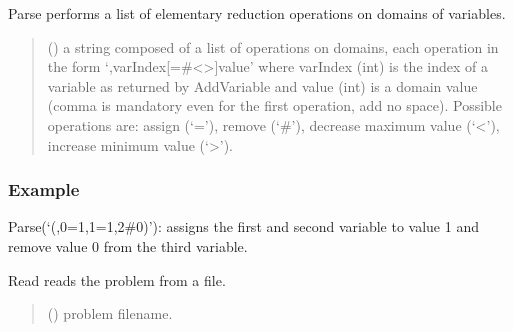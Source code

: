 \documentclass[letterpaper,10pt,openany,oneside,english]{sphinxmanual}
\begin{document}
\begin{fulllineitems}
\begin{fulllineitems}
\label{\detokenize{ref/ref_python:pytoulbar2.CFN.Parse}}
\pysigstartsignatures
{}
\pysigstopsignatures
\sphinxAtStartPar
Parse performs a list of elementary reduction operations on domains of variables.
\begin{quote}\begin{description}
\sphinxAtStartPar
{} () \textendash{} a string composed of a list of operations on domains, each operation in the form ‘,varIndex{[}=\#\textless{}\textgreater{}{]}value’
where varIndex (int) is the index of a variable as returned by AddVariable and value (int) is a domain value
(comma is mandatory even for the first operation, add no space).
Possible operations are: assign (‘=’), remove (‘\#’), decrease maximum value (‘\textless{}’), increase minimum value (‘\textgreater{}’).

\end{description}\end{quote}
\subsubsection*{Example}

\sphinxAtStartPar
Parse(‘(,0=1,1=1,2\#0)’): assigns the first and second variable to value 1 and remove value 0 from the third variable.

\end{fulllineitems}


\begin{fulllineitems}
\label{\detokenize{ref/ref_python:pytoulbar2.CFN.Read}}
\pysigstartsignatures
{}
\pysigstopsignatures
\sphinxAtStartPar
Read reads the problem from a file.
\begin{quote}\begin{description}
\sphinxAtStartPar
{} () \textendash{} problem filename.

\end{description}\end{quote}


\end{fulllineitems}
\end{fulllineitems}
\end{document}
